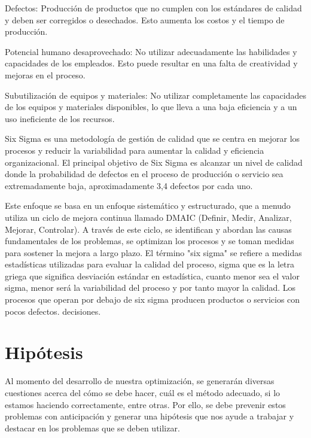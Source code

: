     Defectos: Producción de productos que no cumplen con los estándares de calidad y deben ser corregidos o desechados. Esto aumenta los costos y el tiempo de producción.
    
    Potencial humano desaprovechado: No utilizar adecuadamente las habilidades y capacidades de los empleados. Esto puede resultar en una falta de creatividad y mejoras en el proceso.
    
    Subutilización de equipos y materiales: No utilizar completamente las capacidades de los equipos y materiales disponibles, lo que lleva a una baja eficiencia y a un uso ineficiente de los recursos.
    
    
    Six Sigma es una metodología de gestión de calidad que se centra en mejorar los procesos y reducir la variabilidad para aumentar la calidad y eficiencia organizacional. El principal objetivo de Six Sigma es alcanzar un nivel de calidad donde la probabilidad de defectos en el proceso de producción o servicio sea extremadamente baja, aproximadamente 3,4 defectos por cada uno.
    
    
    Este enfoque se basa en un enfoque sistemático y estructurado, que a menudo utiliza un ciclo de mejora continua llamado DMAIC (Definir, Medir, Analizar, Mejorar, Controlar). A través de este ciclo, se identifican y abordan las causas fundamentales de los problemas, se optimizan los procesos y se toman medidas para sostener la mejora a largo plazo. El término "six sigma" se refiere a medidas estadísticas utilizadas para evaluar la calidad del proceso, sigma que es la letra griega que significa desviación estándar en estadística, cuanto menor sea el valor sigma, menor será la variabilidad del proceso y por tanto mayor la calidad. Los procesos que operan por debajo de six sigma producen productos o servicios con pocos defectos. decisiones.
    
    
    
    \section{Hipótesis}
    
    Al momento del desarrollo de nuestra optimización, se generarán diversas cuestiones acerca del cómo se debe hacer, cuál es el método adecuado, si lo estamos haciendo correctamente, entre otras. Por ello, se debe prevenir estos problemas con anticipación y generar una hipótesis que nos ayude a trabajar y destacar en los problemas que se deben utilizar.
    
